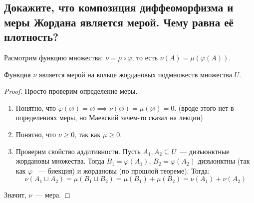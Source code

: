 
\subsection{Докажите, что композиция диффеоморфизма и меры Жордана является мерой. Чему равна её плотность?}

Расмотрим функцию множества: $\nu = \mu \circ \varphi$, то есть $\nu(A) = \mu(\varphi(A))$.

\begin{theorem*}
    Функция $\nu$ является мерой на кольце жордановых подмножеств множества $U$.
\end{theorem*}
\begin{proof}
    Просто проверим определение меры.
    \begin{enumerate}
        \item Понятно, что $\varphi(\varnothing) = \varnothing \implies \nu(\varnothing) = \mu(\varnothing) = 0$. (вроде этого нет в определениях меры, но Маевский зачем-то сказал на лекции)
        \item Понятно, что $\nu \geq 0$, так как $\mu \geq 0$.
        \item Проверим свойство аддитивности.
        Пусть $A_1, A_2 \subseteq U$~--- дизъюнктные жордановы множества. Тогда $B_1 = \varphi(A_1)$, $ B_2 = \varphi(A_2)$ дизъюнктны (так как $\varphi$ ~--- биекция) и жордановы (по прошлой теореме). Тогда:
        \begin{equation*}
            \nu(A_1 \sqcup A_2) = \mu(B_1 \sqcup B_2) = \mu(B_1) + \mu(B_2) = \nu(A_1) + \nu(A_2)
        \end{equation*}
    \end{enumerate}
    Значит, $\nu$~--- мера.

    
\end{proof}